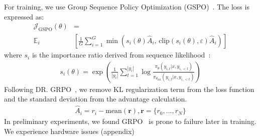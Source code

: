 For training, we use Group Sequence Policy Optimization (GSPO)~\cite{zheng2025groupsequencepolicyoptimization}. The loss is expressed as:
\begin{align}
    \mathcal{J}_{\text{GSPO}}(\theta) &= \nonumber \\  \mathbb{E}_i &\left[ \frac{1}{G} \sum_{i=1}^{G} \min\left( s_i(\theta) \hat{A}_i,\, \text{clip}\left( s_i(\theta), \varepsilon \right) \hat{A}_i \right) \right]
\end{align}
where $s_i$ is the importance ratio derived from sequence likelihood~\cite{zheng-etal-2023-click}:
\begin{align}
    s_i(\theta) = \exp\left( \frac{1}{|y_i|} \sum_{t=1}^{|y_i|} \log \frac{\pi_\theta(y_{i,t} | x, y_{i,<t})}{\pi_{\theta_{\text{old}}}(y_{i,t} | x, y_{i,<t})} \right)
    \label{eq:is}
\end{align}
Following DR. GRPO~\cite{liu2025understandingr1zeroliketrainingcritical}, we remove KL regularization term from the loss function and the standard deviation from the advantage calculation.
\begin{align}
    \hat{A}_i = r_i - \text{mean}(\mathbf{r}), \mathbf{r} = \{r_0, ..., r_N\}
\end{align}
In preliminary experiments, we found GRPO~\cite{shao2024deepseekmathpushinglimitsmathematical} is prone to failure later in training. We experience hardware issues (appendix)





